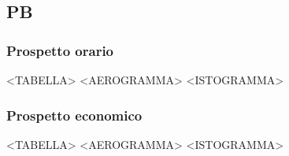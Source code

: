 \subsection{PB}

\subsubsection{Prospetto orario}

<TABELLA>
<AEROGRAMMA>
<ISTOGRAMMA>

\subsubsection{Prospetto economico}

<TABELLA>
<AEROGRAMMA>
<ISTOGRAMMA>

